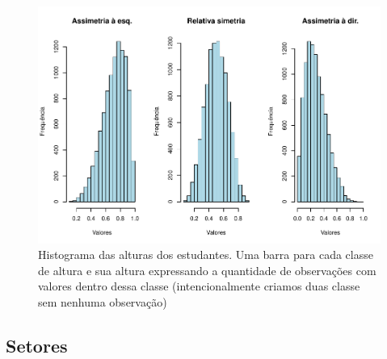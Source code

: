 \documentclass[
]{book}
\newenvironment{Shaded}{\begin{snugshade}}{\end{snugshade}}
\newcommand{\AttributeTok}[1]{\textcolor[rgb]{0.77,0.63,0.00}{#1}}
\newcommand{\DecValTok}[1]{\textcolor[rgb]{0.00,0.00,0.81}{#1}}
\newcommand{\FloatTok}[1]{\textcolor[rgb]{0.00,0.00,0.81}{#1}}
\newcommand{\FunctionTok}[1]{\textcolor[rgb]{0.00,0.00,0.00}{#1}}
\newcommand{\NormalTok}[1]{#1}
\newcommand{\SpecialCharTok}[1]{\textcolor[rgb]{0.00,0.00,0.00}{#1}}
\newcommand{\StringTok}[1]{\textcolor[rgb]{0.31,0.60,0.02}{#1}}
\begin{document}
\begin{Shaded}
\end{Shaded}

\begin{figure}
\centering
\includegraphics{apostila_files/figure-latex/unnamed-chunk-40-1.pdf}
\caption{\label{fig:unnamed-chunk-40}Histograma das alturas dos estudantes. Uma barra para cada classe de altura e sua altura expressando a quantidade de observações com valores dentro dessa classe (intencionalmente criamos duas classe sem nenhuma observação)}
\end{figure}

\hypertarget{setores}{%
\subsection{Setores}\label{setores}}
\end{document}

